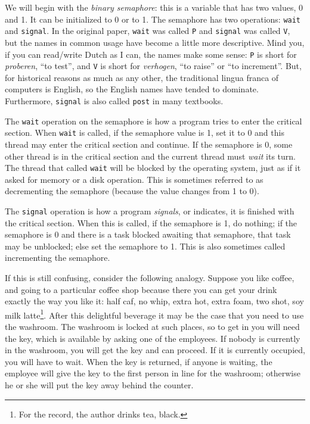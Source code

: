 We will begin with the \textit{binary semaphore}: this is a variable that has two values, 0 and 1. It can be initialized to 0 or to 1. The semaphore has two operations: \texttt{wait} and \texttt{signal}. In the original paper, \texttt{wait} was called \texttt{P} and \texttt{signal} was called \texttt{V}, but the names in common usage have become a little more descriptive. Mind you, if you can read/write Dutch as I can, the names make some sense: \texttt{P} is short for \textit{proberen}, ``to test'', and \texttt{V} is short for \textit{verhogen}, ``to raise'' or ``to increment''. But, for historical reasons as much as any other, the traditional lingua franca of computers is English, so the English names have tended to dominate. Furthermore, \texttt{signal} is also called \texttt{post} in many textbooks.

The \texttt{wait} operation on the semaphore is how a program tries to enter the critical section. When \texttt{wait} is called, if the semaphore value is 1, set it to 0 and this thread may enter the critical section and continue. If the semaphore is 0, some other thread is in the critical section and the current thread must \textit{wait} its turn. The thread that called \texttt{wait} will be blocked by the operating system, just as if it asked for memory or a disk operation. This is sometimes referred to as decrementing the semaphore (because the value changes from 1 to 0).

The \texttt{signal} operation is how a program \textit{signals}, or indicates, it is finished with the critical section. When this is called, if the semaphore is 1, do nothing; if the semaphore is 0 and there is a task blocked awaiting that semaphore, that task may be unblocked; else set the semaphore to 1. This is also sometimes called incrementing the semaphore.

If this is still confusing, consider the following analogy. Suppose you like coffee, and going to a particular coffee shop because there you can get your drink exactly the way you like it: half caf, no whip, extra hot, extra foam, two shot, soy milk latte\footnote{For the record, the author drinks tea, black.}. After this delightful beverage it may be the case that you need to use the washroom. The washroom is locked at such places, so to get in you will need the key, which is available by asking one of the employees. If nobody is currently in the washroom, you will get the key and can proceed. If it is currently occupied, you will have to wait. When the key is returned, if anyone is waiting, the employee will give the key to the first person in line for the washroom; otherwise he or she will put the key away behind the counter.

